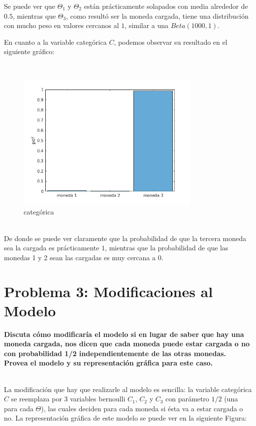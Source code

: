 Se puede ver que $\Theta_{1}$ y $\Theta_{2}$ están prácticamente solapados con media alrededor de $0.5$, mientras que $\Theta_{3}$, como resultó ser la moneda cargada, tiene una
distribución con mucho peso en valores cercanos al $1$, similar a una $Beta(1000,1)$.	

\newpage

En cuanto a la variable categórica $C$, podemos observar su resultado en el siguiente gráfico:

~\\
\begin{figure}[h]
    \includegraphics[width=0.8\textwidth]{imagenes/categorica.jpg}
  \caption{categórica}
\end{figure}
~\\

De donde se puede ver claramente que la probabilidad de que la tercera moneda sea la cargada es prácticamente $1$, mientras que la probabilidad de que las monedas 1 y 2 sean las
cargadas es muy cercana a $0$.



\newpage

\section{Problema 3: Modificaciones al Modelo}

\textbf{Discuta cómo modificaría el modelo si en lugar de saber que hay una moneda cargada, nos dicen que cada moneda puede estar cargada o no con probabilidad 1/2 independientemente
de las otras monedas. Provea el modelo y su representación gráfica para este caso.}

~\\
La modificación que hay que realizarle al modelo es sencilla: la variable categórica $C$ se reemplaza por 3 variables bernoulli $C_{1}$, $C_{2}$ y $C_{3}$ con parámetro $1/2$ (una para cada $\Theta$),
las cuales deciden para cada moneda si ésta va a estar cargada o no. La representación gráfica de este modelo se puede ver en la siguiente Figura:

